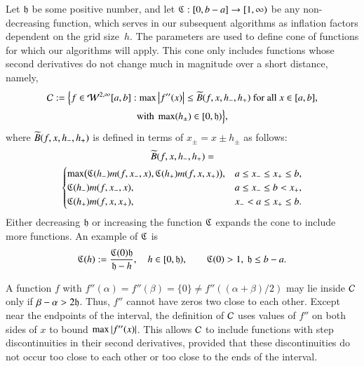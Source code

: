\documentclass[review]{elsarticle}
\makeatletter
\newcommand{\Vast}{\bBigg@{6}}
\theoremstyle{definition}
\newcommand{\Vastr}{\mathclose\Vast}
\makeatother
\begin{document}
Let $\mathfrak{h}$ be some positive number, and let $\mathfrak{C} : [0,b-a] \to [1,\infty)$ be any
non-decreasing function, which serves in our subsequent algorithms as inflation factors dependent on the grid size~$h$.
The parameters are used to define cone of functions for which our algorithms will
apply.  This cone only includes functions whose second derivatives do not change much in
magnitude over a short distance, namely,
\begin{multline} \label{conedef}
 \mathcal{C} :=   \Bigl \{
 f  \in    \mathcal{W}^{2,\infty}[a,b]:   \max\left \lvert f''(x) \right \rvert  \le \widetilde{B}(f,x,h_-,h_+)  \text{ for all } x \in [a,b],
\\ \text{with }  \max(h_{\pm}) \in [0, \mathfrak{h})  \Bigr \},
\end{multline}
where $\widetilde{B}(f,x,h_-,h_+)$ is defined in terms of $x_{\pm} =x \pm h_{\pm}$ as follows:
\begin{multline*}
\tB(f,x,h_-,h_+)=\\
\begin{cases}
  \max\bigl(\fC(h_{-}) m(f,x_-,x),\fC(h_{+}) m(f,x,x_+)\bigr), & a \le x_- \le x_+ \le b,\\
\fC(h_{-}) m(f,x_-,x), & a \le x_- \le b <  x_+,\\
\fC(h_{+}) m(f,x,x_+), & x_- < a \le x_+ \le b.
\end{cases} %
\end{multline*}
Either decreasing $\mathfrak{h}$ or increasing the function $\mathfrak{C}$ expands the cone to include more functions.  An example of $\mathfrak{C}$ is 
\begin{equation} \label{sampleC}
\mathfrak{C}(h) : = \frac{\mathfrak{C}(0) \mathfrak{h}}{\mathfrak{h} - h}, \quad h \in [0,\mathfrak{h}), \qquad \mathfrak{C}(0) > 1,\ \mathfrak{h} \le b - a.
\end{equation}

A function $f$ with $f''(\alpha) = f''(\beta) = \{0\} \ne f''((\alpha+\beta)/2)$ may
lie inside $\mathcal{C}$ only if $\beta - \alpha > 2\mathfrak{h}$. Thus, $f''$ cannot have zeros two close to each other.  Except near the endpoints of
the interval, the definition of $\mathcal{C}$ uses values of $f''$ on both sides of $x$
to bound $\max \left \lvert f''(x) \right \rvert$. This allows $\mathcal{C}$ to include functions with step
discontinuities in their second derivatives, provided that these discontinuities
do not occur too close to each other or too close to the ends of the interval.
\end{document}
